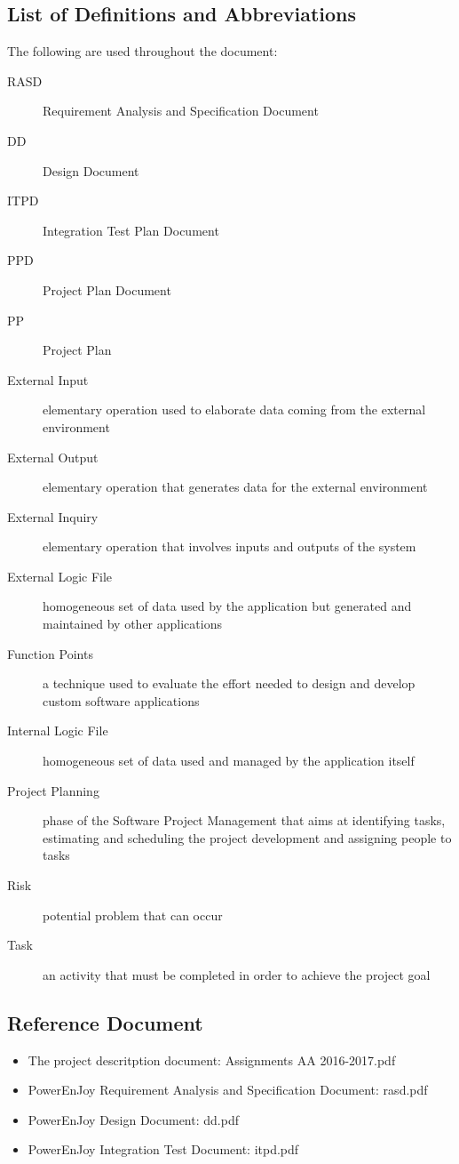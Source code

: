 	
\subsection{List of Definitions and Abbreviations}

	The following are used throughout the document:
	\begin{description}
		\item [RASD] Requirement Analysis and Specification Document
		\item [DD] Design Document
		\item [ITPD] Integration Test Plan Document
		\item [PPD] Project Plan Document
		\item [PP] Project Plan
		\item [External Input] elementary operation used to elaborate data coming from the external environment
		\item [External Output] elementary operation that generates data for the external environment
		\item [External Inquiry] elementary operation that involves inputs and outputs of the system
		\item [External Logic File] homogeneous set of data used by the application but generated and maintained by other applications
		\item [Function Points] a technique used to evaluate the effort needed to design and develop custom software applications
		\item [Internal Logic File] homogeneous set of data used and managed by the application itself
		\item [Project Planning] phase of the Software Project Management that aims at identifying tasks, estimating and scheduling the project development and assigning people to tasks
		\item [Risk] potential problem that can occur
		\item [Task] an activity that must be completed in order to achieve the project goal
	\end{description}


\subsection{Reference Document}
\begin{itemize}
	\item The project descritption document: Assignments AA 2016-2017.pdf
	\item PowerEnJoy Requirement Analysis and Specification Document: rasd.pdf
	\item PowerEnJoy Design Document: dd.pdf
	\item PowerEnJoy Integration Test Document: itpd.pdf
\end{itemize}
	